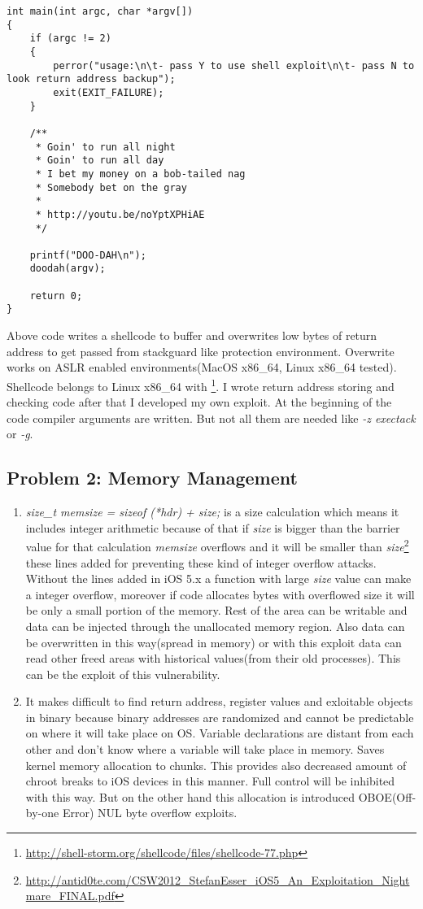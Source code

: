 \documentclass[11pt]{article}
\begin{document}
\begin{enumerate}[\indent a)]
\begin{verbatim}
int main(int argc, char *argv[])
{
    if (argc != 2)
    {
        perror("usage:\n\t- pass Y to use shell exploit\n\t- pass N to look return address backup");
        exit(EXIT_FAILURE);
    }

    /**
     * Goin' to run all night
     * Goin' to run all day
     * I bet my money on a bob-tailed nag
     * Somebody bet on the gray
     * 
     * http://youtu.be/noYptXPHiAE
     */
    
    printf("DOO-DAH\n");
    doodah(argv);

    return 0;
}
\end{verbatim}
Above code writes a shellcode to buffer and overwrites low bytes of return address to get passed from stackguard like protection environment. Overwrite works on ASLR enabled environments(MacOS x86\_64, Linux x86\_64 tested). Shellcode belongs to Linux x86\_64 with \footnote{\url{http://shell-storm.org/shellcode/files/shellcode-77.php}}. I wrote return address storing and checking code after that I developed my own exploit. At the beginning of the code compiler arguments are written. But not all them are needed like \textit{-z exectack} or \textit{-g}.
\end{enumerate}

\subsection*{Problem 2: Memory Management}
\begin{enumerate}[\indent a)]
\item \textit{size\_t memsize = sizeof (*hdr) + size;}
is a size calculation which means it includes integer arithmetic because of that if \textit{size} is bigger than the barrier value for that calculation \textit{memsize} overflows and it will be smaller than \textit{size}\footnote{\url{http://antid0te.com/CSW2012_StefanEsser_iOS5_An_Exploitation_Nightmare_FINAL.pdf}} these lines added for preventing these kind of integer overflow attacks. Without the lines added in iOS 5.x a function with large \textit{size} value can make a integer overflow, moreover if code allocates bytes with overflowed size it will be only a small portion of the memory. Rest of the area can be writable and data can be injected through the unallocated memory region. Also data can be overwritten in this way(spread in memory) or with this exploit data can read other freed areas with historical values(from their old processes). This can be the exploit of this vulnerability.
\item It makes difficult to find return address, register values and exloitable objects in binary because binary addresses are randomized and cannot be predictable on where it will take place on OS. Variable declarations are distant from each other and don't know where a variable will take place in memory. Saves kernel memory allocation to chunks. This provides also decreased amount of chroot breaks to iOS devices in this manner. Full control will be inhibited with this way. But on the other hand this allocation is introduced OBOE(Off-by-one Error) NUL byte overflow exploits.
\end{enumerate}
\end{document}

